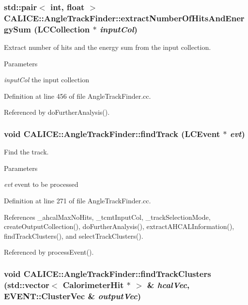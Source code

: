 \subsubsection[{extractNumberOfHitsAndEnergySum}]{\setlength{\rightskip}{0pt plus 5cm}std::pair$<$ int, float $>$ CALICE::AngleTrackFinder::extractNumberOfHitsAndEnergySum (LCCollection $\ast$ {\em inputCol})\hspace{0.3cm}{\ttfamily  [private]}}\label{classCALICE_1_1AngleTrackFinder_a1799da6da5db2cbf5de0e458ccbe3566}


Extract number of hits and the energy sum from the input collection. 
\begin{DoxyParams}{Parameters}
\item[{\em inputCol}]the input collection \end{DoxyParams}


Definition at line 456 of file AngleTrackFinder.cc.

Referenced by doFurtherAnalysis().
\subsubsection[{findTrack}]{\setlength{\rightskip}{0pt plus 5cm}void CALICE::AngleTrackFinder::findTrack (LCEvent $\ast$ {\em evt})\hspace{0.3cm}{\ttfamily  [private]}}\label{classCALICE_1_1AngleTrackFinder_aac50b453e10cdfbb6612eeefcb5ca25c}


Find the track. 
\begin{DoxyParams}{Parameters}
\item[{\em evt}]event to be processed \end{DoxyParams}


Definition at line 271 of file AngleTrackFinder.cc.

References \_\-ahcalMaxNoHits, \_\-tcmtInputCol, \_\-trackSelectionMode, createOutputCollection(), doFurtherAnalysis(), extractAHCALInformation(), findTrackClusters(), and selectTrackClusters().

Referenced by processEvent().
\subsubsection[{findTrackClusters}]{\setlength{\rightskip}{0pt plus 5cm}void CALICE::AngleTrackFinder::findTrackClusters (std::vector$<$ CalorimeterHit $\ast$ $>$ \& {\em hcalVec}, \/  EVENT::ClusterVec \& {\em outputVec})\hspace{0.3cm}{\ttfamily  [private]}}\label{classCALICE_1_1AngleTrackFinder_a24fd651c00cb89fa736943ee252ff5fc}


